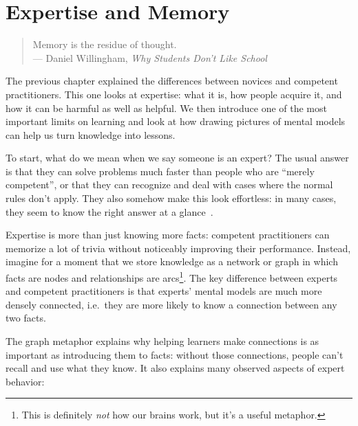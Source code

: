 \chapter{Expertise and Memory}\label{s:memory}

\begin{quote}

  Memory is the residue of thought. \\
  --- Daniel Willingham, \emph{Why Students Don't Like School}

\end{quote}

The previous chapter explained the differences between novices and competent practitioners.
This one looks at expertise:
what it is,
how people acquire it,
and how it can be harmful as well as helpful.
We then introduce one of the most important limits on learning
and look at how drawing pictures of mental models can help us turn knowledge into lessons.

To start,
what do we mean when we say someone is an expert?
The usual answer is that they can solve problems much faster than people who are ``merely competent'',
or that they can recognize and deal with cases where the normal rules don't apply.
They also somehow make this look effortless:
in many cases,
they seem to know the right answer at a glance~\cite{Parn2017}.

Expertise is more than just knowing more facts:
competent practitioners can memorize a lot of trivia without noticeably improving their performance.
Instead,
imagine for a moment that we store knowledge as a network or graph
in which facts are nodes
and relationships are arcs\footnote{This is definitely \emph{not} how our brains work, but it's a useful metaphor.}.
The key difference between experts and competent practitioners is that
experts' mental models are much more densely connected,
i.e.\ they are more likely to know a connection between any two facts.

The graph metaphor explains why helping learners make connections
is as important as introducing them to facts:
without those connections,
people can't recall and use what they know.
It also explains many observed aspects of expert behavior:

